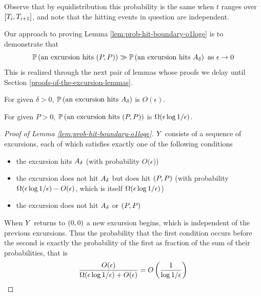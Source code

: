 {  
  Observe that by equidistribution this probability is the same when
  $t$ ranges over $[T_i, T_{i+1}]$, and
  note that the hitting events in question are independent.

\newcommand{\probexcursionhits}[1]{\P\left(\text{an excursion hits } #1\right)}

Our approach to proving Lemma \ref{lem:prob-hit-boundary-o1loge} is to
demonstrate that
\[
\probexcursionhits{\farpoint} \gg
\probexcursionhits{\boundarylines} \text { as } \epsilon \to 0
\]
This is
realized through the next pair of lemmas whose proofs we delay until Section
\ref{proofs-of-the-excursion-lemmas}.

\newcommand{\Omegaeloge}{\Omega(\epsilon\loger)}

\begin{lemma}
  \label{lem:Phitboundaryline}
  For given $\delta > 0$, $\probexcursionhits{\boundarylines}$ is $O(\epsilon)$.
\end{lemma}

\begin{lemma}
  \label{lem:Pabsorbedandtravelsfar}
  For given $P > 0$, $\probexcursionhits{\farpoint}$ is $\Omegaeloge$.
\end{lemma}

\newcommand{\Oe}{O(\epsilon)}

\begin{proof}[Proof of Lemma \ref{lem:prob-hit-boundary-o1loge}]
  $Y$ consists of a sequence of excursions, each of which satisfies
  exactly one of the following conditions
  \begin{itemize}
  \item the excursion hits $A_\delta$ (with probability
    $O(\epsilon$))
  \item the excursion does not hit $A_\delta$ but does hit
    $(P,P)$ (with probability $\Omegaeloge-\Oe$, which is itself
    $\Omegaeloge$)
  \item the excursion does not hit $A_\delta$ or $(P,P)$
  \end{itemize}
  When $Y$ returns to $(0,0)$ a new excursion begins, which is independent of
  the previous excursions.  Thus the probability that the first
  condition occurs before the second is exactly the probability of the
  first as fraction of the sum of their probabilities, that is
  \[
  \frac{\Oe}{\Omegaeloge + \Oe} = O\left(\frac{1}{\loger}\right)
  \]
\end{proof}

}

